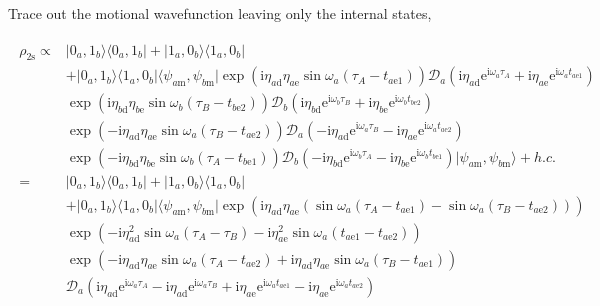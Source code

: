 \documentclass[10pt,fleqn]{article}
\newcommand{\ue}{\mathrm{e}}
\newcommand{\ui}{\mathrm{i}}
\newcommand{\eqar}[1]
{
  \begin{align}
    #1
  \end{align}
}
\newcommand{\paren}[1]{{\left({#1}\right)}}
\begin{document}
Trace out the motional wavefunction leaving only the internal states,
\eqar{
  \begin{split}
    \rho_{2\mathrm{s}}\propto
    &|0_a,1_b\rangle\langle 0_a,1_b|+|1_a,0_b\rangle\langle 1_a,0_b|\\
    &+|0_a,1_b\rangle\langle 1_a,0_b|
      \langle\psi_{a\mathrm{m}},\psi_{b\mathrm{m}}|\exp\paren{\ui\eta_{a\mathrm{d}}\eta_{a\mathrm{e}}
      \sin\omega_a\paren{\tau_A-t_{a\mathrm{e}1}}}
      \mathcal{D}_a(\ui\eta_{a\mathrm{d}}\ue^{\ui\omega_a\tau_A}+\ui\eta_{a\mathrm{e}}\ue^{\ui\omega_at_{a\mathrm{e}1}})\\
    &\exp\paren{\ui\eta_{b\mathrm{d}}\eta_{b\mathrm{e}}
      \sin\omega_b\paren{\tau_B-t_{b\mathrm{e}2}}}
      \mathcal{D}_b(\ui\eta_{b\mathrm{d}}\ue^{\ui\omega_b\tau_B}+\ui\eta_{b\mathrm{e}}\ue^{\ui\omega_bt_{b\mathrm{e}2}})
    \\
    &\exp\paren{-\ui\eta_{a\mathrm{d}}\eta_{a\mathrm{e}}
      \sin\omega_a\paren{\tau_B-t_{a\mathrm{e}2}}}
      \mathcal{D}_a(-\ui\eta_{a\mathrm{d}}\ue^{\ui\omega_a\tau_B}-\ui\eta_{a\mathrm{e}}\ue^{\ui\omega_at_{a\mathrm{e}2}})\\
    &\exp\paren{-\ui\eta_{b\mathrm{d}}\eta_{b\mathrm{e}}
      \sin\omega_b\paren{\tau_A-t_{b\mathrm{e}1}}}
      \mathcal{D}_b(-\ui\eta_{b\mathrm{d}}\ue^{\ui\omega_b\tau_A}-\ui\eta_{b\mathrm{e}}\ue^{\ui\omega_bt_{b\mathrm{e}1}})
      |\psi_{a\mathrm{m}},\psi_{b\mathrm{m}}\rangle+h.c.\\
    =&|0_a,1_b\rangle\langle 0_a,1_b|+|1_a,0_b\rangle\langle 1_a,0_b|\\
    &+|0_a,1_b\rangle\langle 1_a,0_b|
      \langle\psi_{a\mathrm{m}},\psi_{b\mathrm{m}}|
      \exp\paren{\ui\eta_{a\mathrm{d}}\eta_{a\mathrm{e}}\paren{\sin\omega_a\paren{\tau_A-t_{a\mathrm{e}1}}-\sin\omega_a\paren{\tau_B-t_{a\mathrm{e}2}}}}\\
    &\exp\paren{
      -\ui\eta_{a\mathrm{d}}^2\sin\omega_a\paren{\tau_A-\tau_B}-\ui\eta_{a\mathrm{e}}^2\sin\omega_a\paren{t_{a\mathrm{e}1}-t_{a\mathrm{e}2}}
      }\\
    &\exp\paren{
      -\ui\eta_{a\mathrm{d}}\eta_{a\mathrm{e}}\sin\omega_a\paren{\tau_A-t_{a\mathrm{e}2}}+\ui\eta_{a\mathrm{d}}\eta_{a\mathrm{e}}\sin\omega_a\paren{\tau_B-t_{a\mathrm{e}1}}
      }\\
    &\mathcal{D}_a(\ui\eta_{a\mathrm{d}}\ue^{\ui\omega_a\tau_A}-\ui\eta_{a\mathrm{d}}\ue^{\ui\omega_a\tau_B}+\ui\eta_{a\mathrm{e}}\ue^{\ui\omega_at_{a\mathrm{e}1}}-\ui\eta_{a\mathrm{e}}\ue^{\ui\omega_at_{a\mathrm{e}2}})\\

\end{split}}
\end{document}
